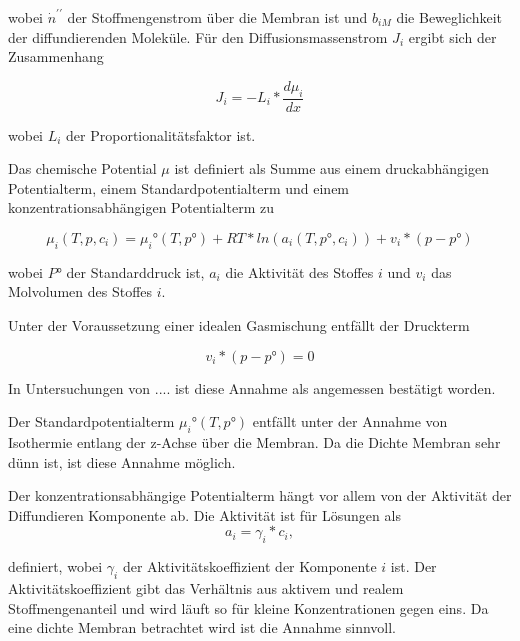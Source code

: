\begin{normalsize}
\begin{LARGE}
wobei $\dot{n}^{\prime\prime}$ der Stoffmengenstrom über die Membran ist und $b_{iM}$ die Beweglichkeit der diffundierenden Moleküle. 
Für den Diffusionsmassenstrom $J_{i}$ ergibt sich der Zusammenhang

\begin{equation}
J_{i} = -L_{i}*\frac{d\mu_{i}}{dx}
\end{equation}

wobei $L_{i}$ der Proportionalitätsfaktor ist.

Das chemische Potential $\mu$ ist definiert als Summe aus einem druckabhängigen Potentialterm, einem Standardpotentialterm und einem konzentrationsabhängigen Potentialterm zu

\begin{equation}
\mu_{i}(T,p,c_{i}) = \mu_{i}°(T,p°) + RT*ln(a_{i}(T,p°,c_{i})) + v_{i}*(p-p°)
\end{equation}


wobei $P°$ der Standarddruck ist, $a_{i}$ die Aktivität des Stoffes $i$ und $v_{i}$ das Molvolumen des Stoffes $i$.


Unter der Voraussetzung einer idealen Gasmischung entfällt der Druckterm

\begin{equation}
v_{i}*(p-p°)= 0
\end{equation}

In Untersuchungen von .... ist diese Annahme als angemessen bestätigt worden.

Der Standardpotentialterm $\mu_{i}°(T,p°)$ entfällt unter der Annahme von Isothermie entlang der z-Achse über die Membran. Da die Dichte Membran sehr dünn ist, ist diese Annahme möglich.

Der konzentrationsabhängige Potentialterm hängt vor allem von der Aktivität der Diffundieren Komponente ab. Die Aktivität ist für Lösungen als
\begin{equation}
a_{i} = \gamma_{i}  * c_{i},
\end{equation}

definiert, wobei $\gamma_{i}$ der Aktivitätskoeffizient der Komponente $i$ ist. Der Aktivitätskoeffizient gibt das Verhältnis aus aktivem und realem Stoffmengenanteil und wird läuft so für kleine Konzentrationen gegen eins. Da eine dichte Membran betrachtet wird ist die Annahme sinnvoll.


\end{LARGE}
\end{normalsize}
